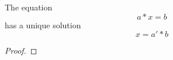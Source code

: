 \documentclass{report}
\begin{document}
\begin{theorem}
    The equation
    \begin{equation*}
        a * x = b
    \end{equation*}
    has a unique solution
    \begin{equation*}
        x  = a' * b
    \end{equation*}
\end{theorem}
\begin{proof}
\end{proof}
\end{document}
